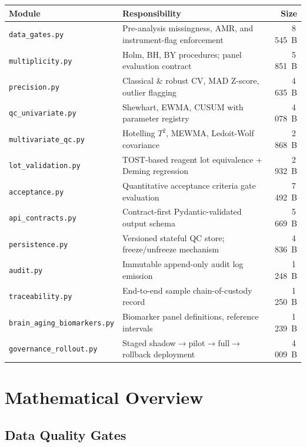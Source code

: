 \documentclass[11pt,a4paper]{article}
\begin{document}
\begin{longtable}{@{}lp{8cm}r@{}}
\toprule
\textbf{Module} & \textbf{Responsibility} & \textbf{Size} \\
\midrule
\texttt{data\_gates.py}        & Pre-analysis missingness, AMR, and instrument-flag enforcement & 8\,545~B \\
\texttt{multiplicity.py}       & Holm, BH, BY procedures; panel evaluation contract            & 5\,851~B \\
\texttt{precision.py}          & Classical \& robust CV, MAD Z-score, outlier flagging         & 4\,635~B \\
\texttt{qc\_univariate.py}     & Shewhart, EWMA, CUSUM with parameter registry                 & 4\,078~B \\
\texttt{multivariate\_qc.py}   & Hotelling $T^2$, MEWMA, Ledoit-Wolf covariance                & 2\,868~B \\
\texttt{lot\_validation.py}    & TOST-based reagent lot equivalence + Deming regression        & 2\,932~B \\
\texttt{acceptance.py}         & Quantitative acceptance criteria gate evaluation              & 7\,492~B \\
\texttt{api\_contracts.py}     & Contract-first Pydantic-validated output schema               & 5\,669~B \\
\texttt{persistence.py}        & Versioned stateful QC store; freeze/unfreeze mechanism        & 4\,836~B \\
\texttt{audit.py}              & Immutable append-only audit log emission                      & 1\,248~B \\
\texttt{traceability.py}       & End-to-end sample chain-of-custody record                     & 1\,250~B \\
\texttt{brain\_aging\_biomarkers.py} & Biomarker panel definitions, reference intervals        & 1\,239~B \\
\texttt{governance\_rollout.py}& Staged shadow$\to$pilot$\to$full$\to$rollback deployment      & 4\,009~B \\
\bottomrule
\end{longtable}

\section{Mathematical Overview}
\label{sec:math}

\subsection{Data Quality Gates}
\label{sec:gates}
\end{document}
